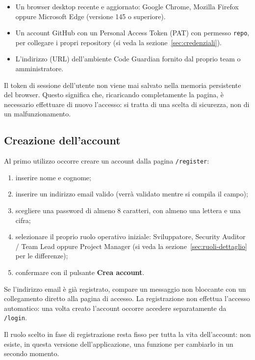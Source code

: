 \documentclass[11pt,a4paper]{article}
\newcommand{\route}[1]{\texttt{#1}}
\newcommand{\code}[1]{\texttt{#1}}
\begin{document}
\begin{itemize}
  \item Un browser desktop recente e aggiornato: Google Chrome, Mozilla Firefox oppure
        Microsoft Edge (versione 145 o superiore).
  \item Un account GitHub con un Personal Access Token (PAT) con permesso \code{repo},
        per collegare i propri repository (si veda la sezione~\ref{sec:credenziali}).
  \item L'indirizzo (URL) dell'ambiente Code Guardian fornito dal proprio team o
        amministratore.
\end{itemize}

\begin{avviso}
Il token di sessione dell'utente non viene mai salvato nella memoria persistente del browser.
Questo significa che, ricaricando completamente la pagina, è necessario effettuare di nuovo
l'accesso: si tratta di una scelta di sicurezza, non di un malfunzionamento.
\end{avviso}

\subsection{Creazione dell'account}

Al primo utilizzo occorre creare un account dalla pagina \route{/register}:

\begin{enumerate}
  \item inserire nome e cognome;
  \item inserire un indirizzo email valido (verrà validato mentre si compila il campo);
  \item scegliere una password di almeno 8 caratteri, con almeno una lettera e una cifra;
  \item selezionare il proprio ruolo operativo iniziale: Sviluppatore, Security Auditor /
        Team Lead oppure Project Manager (si veda la sezione~\ref{sec:ruoli-dettaglio} per
        le differenze);
  \item confermare con il pulsante \textbf{Crea account}.
\end{enumerate}

Se l'indirizzo email è già registrato, compare un messaggio non bloccante con un collegamento
diretto alla pagina di accesso. La registrazione non effettua l'accesso automatico: una volta
creato l'account occorre accedere separatamente da \route{/login}.

\newpage
\begin{nota}
Il ruolo scelto in fase di registrazione resta fisso per tutta la vita dell'account: non
esiste, in questa versione dell'applicazione, una funzione per cambiarlo in un secondo
momento.
\end{nota}
\end{document}
